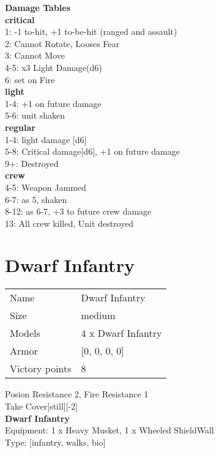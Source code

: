 {\bf Damage Tables} \\
 {\bf critical } \\
1: -1 to-hit, +1 to-be-hit (ranged and assault) \\
2: Cannot Rotate, Looses Fear \\
3: Cannot Move \\
4-5: x3 Light Damage(d6) \\
6: set on Fire \\
 {\bf light } \\
1-4: +1 on future damage \\
5-6: unit shaken \\
 {\bf regular } \\
1-4: light damage [d6] \\
5-8: Critical damage[d6], +1 on future damage \\
9+: Destroyed \\
 {\bf crew } \\
4-5: Weapon Jammed \\
6-7: as 5, shaken \\
8-12: as 6-7, +3 to future crew damage \\
13: All crew killed, Unit destroyed \\










\pagebreak\pagebreak

\section{ Dwarf Infantry }

\begin{tabular}{ll}
  Name & Dwarf Infantry \\
  Size & medium\\
  Models & 4 x Dwarf Infantry\\
  Armor & [0, 0, 0, 0]\\
  Victory points & 8\\
\end{tabular}

Posion Resistance 2, Fire Resistance 1\\ 
Take Cover[still][-2]\\ 


{\bf Dwarf Infantry } \\
Equipment: 1 x Heavy Musket, 1 x Wheeled ShieldWall \\
Type: [infantry, walks, bio] \\

